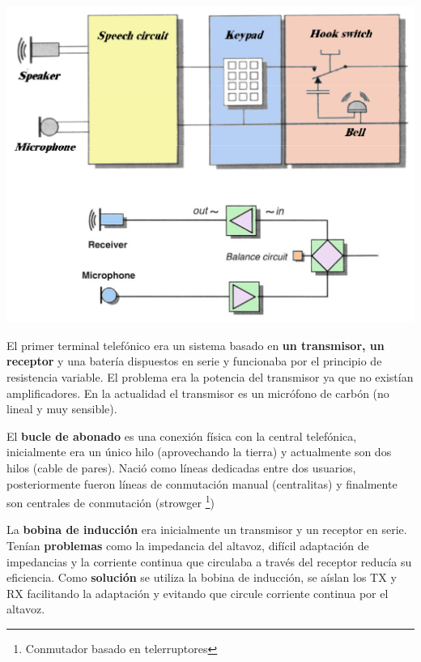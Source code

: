 \documentclass[10pt,portrait, twocolumn]{article}
\makeatletter
\renewcommand{\subsubsection}{\@startsection{subsubsection}{3}{0mm}%
                                {-1ex plus -.5ex minus -.2ex}%
                                {1ex plus .2ex}%
                                {\normalfont\small\bfseries}}
\makeatother
\begin{document}
	\begin{center}
		\includegraphics[scale=0.3]{images/TerminalTelefonico}
	\end{center}

El primer terminal telefónico era un sistema basado en \textbf{un transmisor, un receptor} y una batería dispuestos en serie y funcionaba por el principio de resistencia variable. El problema era la potencia del transmisor ya que no existían amplificadores. En la actualidad el transmisor es un micrófono de carbón (no lineal y muy sensible).

El \textbf{bucle de abonado} es una conexión física con la central telefónica, inicialmente era un único hilo (aprovechando la tierra) y actualmente son dos hilos (cable de pares). Nació como líneas dedicadas entre dos usuarios, posteriormente fueron líneas de conmutación manual (centralitas) y finalmente son centrales de conmutación (strowger \footnote{Conmutador basado en telerruptores})


La \textbf{bobina de inducción} era inicialmente un transmisor y un receptor en serie. Tenían \textbf{problemas} como la impedancia del altavoz, difícil adaptación de impedancias y la corriente continua que circulaba a través del receptor reducía su eficiencia. Como \textbf{solución} se utiliza la bobina de inducción, se aíslan los TX y RX facilitando la adaptación y evitando que circule corriente continua por el altavoz.

\end{document}
